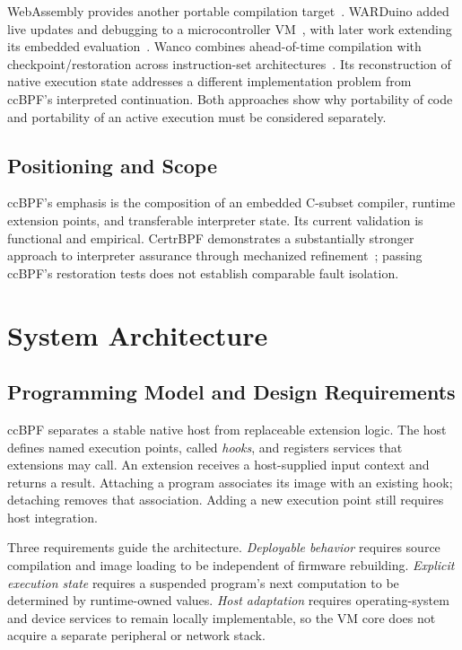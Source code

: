 \documentclass[conference,letterpaper]{IEEEtran}
\begin{document}
WebAssembly provides another portable compilation target~\cite{wasm}. WARDuino added live updates and debugging to a microcontroller VM~\cite{warduino}, with later work extending its embedded evaluation~\cite{warduino24}. Wanco combines ahead-of-time compilation with checkpoint/restoration across instruction-set architectures~\cite{wanco}. Its reconstruction of native execution state addresses a different implementation problem from ccBPF's interpreted continuation. Both approaches show why portability of code and portability of an active execution must be considered separately.

\subsection{Positioning and Scope}
ccBPF's emphasis is the composition of an embedded C-subset compiler, runtime extension points, and transferable interpreter state. Its current validation is functional and empirical. CertrBPF demonstrates a substantially stronger approach to interpreter assurance through mechanized refinement~\cite{certrbpf}; passing ccBPF's restoration tests does not establish comparable fault isolation.

\section{System Architecture}
\subsection{Programming Model and Design Requirements}
ccBPF separates a stable native host from replaceable extension logic. The host defines named execution points, called \emph{hooks}, and registers services that extensions may call. An extension receives a host-supplied input context and returns a result. Attaching a program associates its image with an existing hook; detaching removes that association. Adding a new execution point still requires host integration.

Three requirements guide the architecture. \emph{Deployable behavior} requires source compilation and image loading to be independent of firmware rebuilding. \emph{Explicit execution state} requires a suspended program's next computation to be determined by runtime-owned values. \emph{Host adaptation} requires operating-system and device services to remain locally implementable, so the VM core does not acquire a separate peripheral or network stack.
\end{document}
